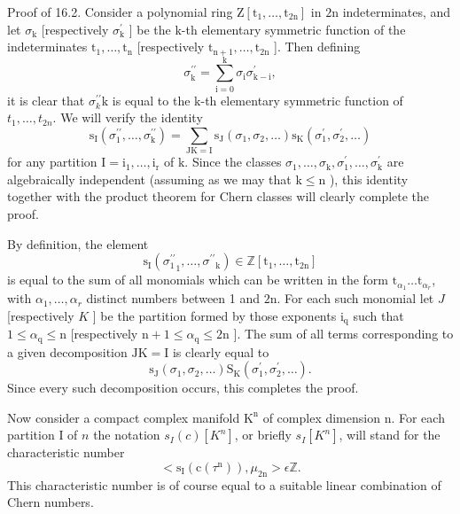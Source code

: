 \documentclass[10pt]{article}
\begin{document}
Proof of 16.2. Consider a polynomial ring $\mathrm{Z}\left[\mathrm{t}_{1}, \ldots, \mathrm{t}_{2 \mathrm{n}}\right]$ in $2 \mathrm{n}$ indeterminates, and let $\sigma_{\mathrm{k}}$ [respectively $\sigma_{\mathrm{k}}^{\prime}$ ] be the $\mathrm{k}$-th elementary symmetric function of the indeterminates $\mathrm{t}_{1}, \ldots, \mathrm{t}_{\mathrm{n}}$ [respectively $\mathrm{t}_{\mathrm{n}+1}, \ldots, \mathrm{t}_{2 \mathrm{n}}$ ]. Then defining
$$
\sigma_{\mathrm{k}}^{\prime \prime}=\sum_{\mathrm{i}=0}^{\mathrm{k}} \sigma_{\mathrm{i}} \sigma_{\mathrm{k}-\mathrm{i}}^{\prime},
$$
it is clear that $\sigma_{k}^{\prime \prime} \mathrm{k}$ is equal to the $\mathrm{k}$-th elementary symmetric function of $t_{1}, \ldots, t_{2 n} .$ We will verify the identity
$$
\mathrm{s}_{\mathrm{I}}\left(\sigma_{1}^{\prime \prime}, \ldots, \sigma_{\mathrm{k}}^{\prime \prime}\right)=\sum_{\mathrm{JK}=\mathrm{I}} \mathrm{s}_{\mathrm{J}}\left(\sigma_{1}, \sigma_{2}, \ldots\right) \mathrm{s}_{\mathrm{K}}\left(\sigma_{1}^{\prime}, \sigma_{2}^{\prime}, \ldots\right)
$$
for any partition $\mathrm{I}=\mathrm{i}_{1}, \ldots, \mathrm{i}_{\mathrm{r}}$ of $\mathrm{k}$. Since the classes $\sigma_{1}, \ldots, \sigma_{\mathrm{k}}, \sigma_{1}^{\prime}, \ldots, \sigma_{\mathrm{k}}^{\prime}$ are algebraically independent (assuming as we may that $\mathrm{k} \leq \mathrm{n}$ ), this identity together with the product theorem for Chern classes will clearly complete the proof.

By definition, the element
$$
\mathrm{s}_{\mathrm{I}}\left({\sigma_{1}^{\prime \prime}}_{1}, \ldots,{\sigma^{\prime \prime}}_{\mathrm{k}}\right) \in \mathbb{Z}\left[\mathrm{t}_{1}, \ldots, \mathrm{t}_{2 \mathrm{n}}\right]
$$
is equal to the sum of all monomials which can be written in the form $\mathrm{t}_{\alpha_{1}} \ldots \mathrm{t}_{\alpha_{r}}$, with $\alpha_{1}, \ldots, \alpha_{r}$ distinct numbers between 1 and $2 \mathrm{n}$. For each such monomial let $J$ [respectively $K$ ] be the partition formed by those exponents $\mathrm{i}_{\mathrm{q}}$ such that $1 \leq \alpha_{\mathrm{q}} \leq \mathrm{n}$ [respectively $\mathrm{n}+1 \leq \alpha_{\mathrm{q}} \leq 2 \mathrm{n}$ ]. The sum of all terms corresponding to a given decomposition $\mathrm{JK}=\mathrm{I}$ is clearly equal to
$$
\mathrm{s}_{\mathrm{J}}\left(\sigma_{1}, \sigma_{2}, \ldots\right) \mathrm{S}_{\mathrm{K}}\left(\sigma_{1}^{\prime}, \sigma_{2}^{\prime}, \ldots\right) .
$$
Since every such decomposition occurs, this completes the proof.

Now consider a compact complex manifold $\mathrm{K}^{\mathrm{n}}$ of complex dimension n. For each partition I of $n$ the notation $s_{I}(c)\left[K^{n}\right]$, or briefly $s_{I}\left[K^{n}\right]$, will stand for the characteristic number
$$
<\mathrm{s}_{\mathrm{I}}\left(\mathrm{c}\left(\tau^{\mathrm{n}}\right)\right), \mu_{2 \mathrm{n}}>\epsilon \mathbb{Z} .
$$
This characteristic number is of course equal to a suitable linear combination of Chern numbers.
\end{document}
